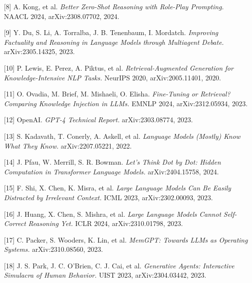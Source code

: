 \documentclass[11pt]{article}
\begin{document}
[8] A. Kong, et al. \emph{Better Zero-Shot Reasoning with Role-Play Prompting.} NAACL 2024,
arXiv:2308.07702, 2024.

[9] Y. Du, S. Li, A. Torralba, J. B. Tenenbaum, I. Mordatch. \emph{Improving Factuality and
Reasoning in Language Models through Multiagent Debate.} arXiv:2305.14325, 2023.

[10] P. Lewis, E. Perez, A. Piktus, et al. \emph{Retrieval-Augmented Generation for
Knowledge-Intensive NLP Tasks.} NeurIPS 2020, arXiv:2005.11401, 2020.

[11] O. Ovadia, M. Brief, M. Mishaeli, O. Elisha. \emph{Fine-Tuning or Retrieval? Comparing
Knowledge Injection in LLMs.} EMNLP 2024, arXiv:2312.05934, 2023.

[12] OpenAI. \emph{GPT-4 Technical Report.} arXiv:2303.08774, 2023.

[13] S. Kadavath, T. Conerly, A. Askell, et al. \emph{Language Models (Mostly) Know What They
Know.} arXiv:2207.05221, 2022.

[14] J. Pfau, W. Merrill, S. R. Bowman. \emph{Let's Think Dot by Dot: Hidden Computation in
Transformer Language Models.} arXiv:2404.15758, 2024.

[15] F. Shi, X. Chen, K. Misra, et al. \emph{Large Language Models Can Be Easily Distracted by
Irrelevant Context.} ICML 2023, arXiv:2302.00093, 2023.

[16] J. Huang, X. Chen, S. Mishra, et al. \emph{Large Language Models Cannot Self-Correct
Reasoning Yet.} ICLR 2024, arXiv:2310.01798, 2023.

[17] C. Packer, S. Wooders, K. Lin, et al. \emph{MemGPT: Towards LLMs as Operating Systems.}
arXiv:2310.08560, 2023.

[18] J. S. Park, J. C. O'Brien, C. J. Cai, et al. \emph{Generative Agents: Interactive
Simulacra of Human Behavior.} UIST 2023, arXiv:2304.03442, 2023.

\endgroup
\end{document}
